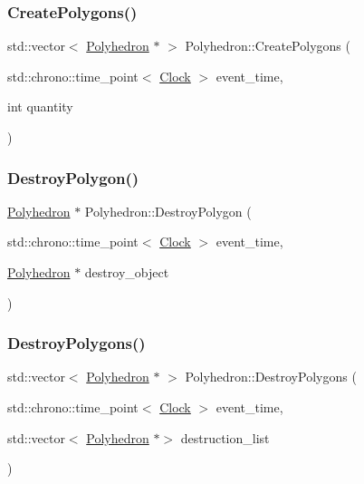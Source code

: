 \mbox{\label{classPolyhedron_a1848eb8747c1132c40c2d27336af2896}} 
\subsubsection{\texorpdfstring{Create\+Polygons()}{CreatePolygons()}}
{\footnotesize\ttfamily std\+::vector$<$ \mbox{\hyperlink{classPolyhedron}{Polyhedron}} $\ast$ $>$ Polyhedron\+::\+Create\+Polygons (\begin{DoxyParamCaption}\item[{std\+::chrono\+::time\+\_\+point$<$ \mbox{\hyperlink{universe_8h_a0ef8d951d1ca5ab3cfaf7ab4c7a6fd80}{Clock}} $>$}]{event\+\_\+time,  }\item[{int}]{quantity }\end{DoxyParamCaption})}

\mbox{\label{classPolyhedron_a2fcc5144ebc64363f40c31d2b980cfaf}} 
\subsubsection{\texorpdfstring{Destroy\+Polygon()}{DestroyPolygon()}}
{\footnotesize\ttfamily \mbox{\hyperlink{classPolyhedron}{Polyhedron}} $\ast$ Polyhedron\+::\+Destroy\+Polygon (\begin{DoxyParamCaption}\item[{std\+::chrono\+::time\+\_\+point$<$ \mbox{\hyperlink{universe_8h_a0ef8d951d1ca5ab3cfaf7ab4c7a6fd80}{Clock}} $>$}]{event\+\_\+time,  }\item[{\mbox{\hyperlink{classPolyhedron}{Polyhedron}} $\ast$}]{destroy\+\_\+object }\end{DoxyParamCaption})}

\mbox{\label{classPolyhedron_ae372d216765d48b9423ee37a8bf8b282}} 
\subsubsection{\texorpdfstring{Destroy\+Polygons()}{DestroyPolygons()}}
{\footnotesize\ttfamily std\+::vector$<$ \mbox{\hyperlink{classPolyhedron}{Polyhedron}} $\ast$ $>$ Polyhedron\+::\+Destroy\+Polygons (\begin{DoxyParamCaption}\item[{std\+::chrono\+::time\+\_\+point$<$ \mbox{\hyperlink{universe_8h_a0ef8d951d1ca5ab3cfaf7ab4c7a6fd80}{Clock}} $>$}]{event\+\_\+time,  }\item[{std\+::vector$<$ \mbox{\hyperlink{classPolyhedron}{Polyhedron}} $\ast$$>$}]{destruction\+\_\+list }\end{DoxyParamCaption})}

